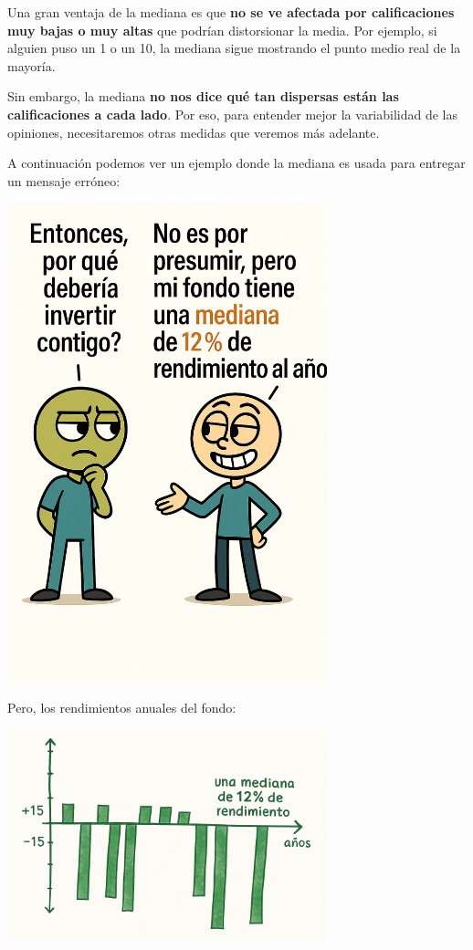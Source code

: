 \documentclass[
  spanish,
  letterpaper,
  DIV=11,
  numbers=noendperiod]{scrreprt}
\begin{document}
Una gran ventaja de la mediana es que \textbf{no se ve afectada por
calificaciones muy bajas o muy altas} que podrían distorsionar la media.
Por ejemplo, si alguien puso un 1 o un 10, la mediana sigue mostrando el
punto medio real de la mayoría.

Sin embargo, la mediana \textbf{no nos dice qué tan dispersas están las
calificaciones a cada lado}. Por eso, para entender mejor la
variabilidad de las opiniones, necesitaremos otras medidas que veremos
más adelante.

A continuación podemos ver un ejemplo donde la mediana es usada para
entregar un mensaje erróneo:

\begin{center}
\includegraphics[width=3.64583in,height=\textheight,keepaspectratio]{img/mediana_1.png}
\end{center}

Pero, los rendimientos anuales del fondo:

\begin{center}
\includegraphics[width=3.64583in,height=\textheight,keepaspectratio]{img/mediana_2.png}
\end{center}
\end{document}
